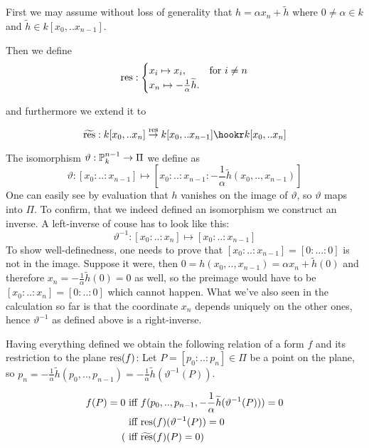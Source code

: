 First we may assume without loss of generality that
$h = \alpha x_n + \widetilde h$ where $0 \neq \alpha \in k$ and $\widetilde h \in k[x_0,..x_{n-1}]$.

Then we define
\begin{equation}
{\operatorname{res}} : \begin{cases}
x_i \mapsto x_i, & \text{for } i \neq n \\
x_n \mapsto -\frac 1\alpha \widetilde h. &
\end{cases}
\end{equation}

and furthermore we extend it to

\begin{equation}
\widetilde{\var{res}} : k[x_0,.. x_n] \overset{\var{res}}\to k[x_0,.. x_{n-1}] \hookr k[x_0,.. x_n]
\end{equation}

The isomorphism $\vartheta : \operatorname{\mathbb P}^{n-1}_k \to \Pi$ we define as
\begin{equation}
\vartheta : [x_0:..:x_{n-1}] \mapsto [x_0:..:x_{n-1}:-\frac 1\alpha \widetilde h(x_0,..,x_{n-1})]
\end{equation}
One can easily see by evaluation that $h$ vanishes on the image of $\vartheta$, so $\vartheta$ maps into $\Pi$. To confirm, that we indeed defined an isomorphism we construct an inverse.
A left-inverse of couse has to look like this:
\begin{equation}
\vartheta^{-1} : [x_0:..:x_n] \mapsto [x_0:..:x_{n-1}]
\end{equation}
To show well-definedness, one needs to prove that $[x_0:..:x_{n-1}] = [0:...:0]$ is not in the image. Suppose it were, then $0 = h(x_0,..,x_{n-1}) = \alpha x_n + \widetilde h(0)$ and therefore $x_n = -\frac 1\alpha \widetilde h(0) = 0$ as well, so the preimage would have to be $[x_0:..:x_n] = [0:..:0]$ which cannot happen.
What we've also seen in the calculation so far is that the coordinate $x_n$ depends uniquely on the other ones, hence $\vartheta^{-1}$ as defined above is a right-inverse.

Having everything defined we obtain the following relation of a form $f$ and its restriction to the plane ${\operatorname{res}}(f)$: Let $P = [p_0:..:p_n] \in \Pi$ be a point on the plane, so $p_n = -\frac 1\alpha \widetilde h(p_0,..,p_{n-1}) = -\frac 1\alpha \widetilde h(\vartheta^{-1}(P))$.

\begin{align}
f(P) = 0
&\text{ iff } f(p_0,..,p_{n-1},-\frac 1\alpha \widetilde h(\vartheta^{-1}(P))) = 0
\\
&\text { iff } {\operatorname{res}}(f)(\vartheta^{-1}(P)) = 0
\\
(&\text{ iff } \widetilde{{\operatorname{res}}}(f)(P) = 0)
\end{align}

